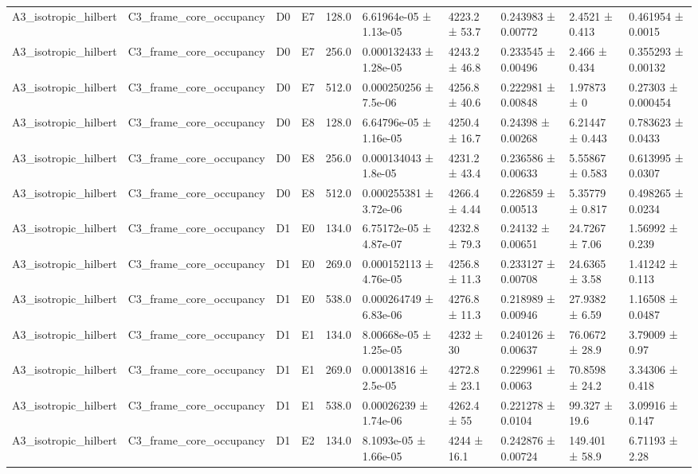 \begin{table}
\begin{tabular}{llllllllll}
A3\_isotropic\_hilbert & C3\_frame\_core\_occupancy & D0 & E7 & 128.0 & 6.61964e-05 ± 1.13e-05 & 4223.2 ± 53.7 & 0.243983 ± 0.00772 & 2.4521 ± 0.413 & 0.461954 ± 0.0015 \\
A3\_isotropic\_hilbert & C3\_frame\_core\_occupancy & D0 & E7 & 256.0 & 0.000132433 ± 1.28e-05 & 4243.2 ± 46.8 & 0.233545 ± 0.00496 & 2.466 ± 0.434 & 0.355293 ± 0.00132 \\
A3\_isotropic\_hilbert & C3\_frame\_core\_occupancy & D0 & E7 & 512.0 & 0.000250256 ± 7.5e-06 & 4256.8 ± 40.6 & 0.222981 ± 0.00848 & 1.97873 ± 0 & 0.27303 ± 0.000454 \\
A3\_isotropic\_hilbert & C3\_frame\_core\_occupancy & D0 & E8 & 128.0 & 6.64796e-05 ± 1.16e-05 & 4250.4 ± 16.7 & 0.24398 ± 0.00268 & 6.21447 ± 0.443 & 0.783623 ± 0.0433 \\
A3\_isotropic\_hilbert & C3\_frame\_core\_occupancy & D0 & E8 & 256.0 & 0.000134043 ± 1.8e-05 & 4231.2 ± 43.4 & 0.236586 ± 0.00633 & 5.55867 ± 0.583 & 0.613995 ± 0.0307 \\
A3\_isotropic\_hilbert & C3\_frame\_core\_occupancy & D0 & E8 & 512.0 & 0.000255381 ± 3.72e-06 & 4266.4 ± 4.44 & 0.226859 ± 0.00513 & 5.35779 ± 0.817 & 0.498265 ± 0.0234 \\
A3\_isotropic\_hilbert & C3\_frame\_core\_occupancy & D1 & E0 & 134.0 & 6.75172e-05 ± 4.87e-07 & 4232.8 ± 79.3 & 0.24132 ± 0.00651 & 24.7267 ± 7.06 & 1.56992 ± 0.239 \\
A3\_isotropic\_hilbert & C3\_frame\_core\_occupancy & D1 & E0 & 269.0 & 0.000152113 ± 4.76e-05 & 4256.8 ± 11.3 & 0.233127 ± 0.00708 & 24.6365 ± 3.58 & 1.41242 ± 0.113 \\
A3\_isotropic\_hilbert & C3\_frame\_core\_occupancy & D1 & E0 & 538.0 & 0.000264749 ± 6.83e-06 & 4276.8 ± 11.3 & 0.218989 ± 0.00946 & 27.9382 ± 6.59 & 1.16508 ± 0.0487 \\
A3\_isotropic\_hilbert & C3\_frame\_core\_occupancy & D1 & E1 & 134.0 & 8.00668e-05 ± 1.25e-05 & 4232 ± 30 & 0.240126 ± 0.00637 & 76.0672 ± 28.9 & 3.79009 ± 0.97 \\
A3\_isotropic\_hilbert & C3\_frame\_core\_occupancy & D1 & E1 & 269.0 & 0.00013816 ± 2.5e-05 & 4272.8 ± 23.1 & 0.229961 ± 0.0063 & 70.8598 ± 24.2 & 3.34306 ± 0.418 \\
A3\_isotropic\_hilbert & C3\_frame\_core\_occupancy & D1 & E1 & 538.0 & 0.00026239 ± 1.74e-06 & 4262.4 ± 55 & 0.221278 ± 0.0104 & 99.327 ± 19.6 & 3.09916 ± 0.147 \\
A3\_isotropic\_hilbert & C3\_frame\_core\_occupancy & D1 & E2 & 134.0 & 8.1093e-05 ± 1.66e-05 & 4244 ± 16.1 & 0.242876 ± 0.00724 & 149.401 ± 58.9 & 6.71193 ± 2.28 \\

\end{tabular}
\end{table}
